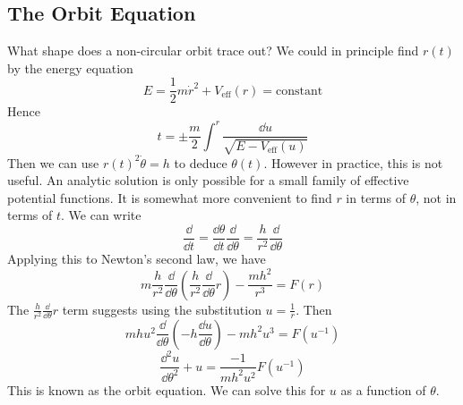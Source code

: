 \documentclass{article}
\begin{document}
\subsection{The Orbit Equation}
What shape does a non-circular orbit trace out? We could in principle find $r(t)$ by the energy equation
\[ E = \frac{1}{2}m \dot r^2 + V_\text{eff}(r) = \text{constant} \]
Hence
\[ t = \pm \frac{m}{2} \int^r \frac{\dd u}{\sqrt{E - V_\text{eff}(u)}} \]
Then we can use $r(t)^2\dot \theta = h$ to deduce $\theta(t)$. However in practice, this is not useful. An analytic solution is only possible for a small family of effective potential functions. It is somewhat more convenient to find $r$ in terms of $\theta$, not in terms of $t$. We can write
\[ \frac{\dd}{\dd t} = \frac{\dd \theta}{\dd t} \frac{\dd}{\dd \theta} = \frac{h}{r^2} \frac{\dd}{\dd \theta} \]
Applying this to Newton's second law, we have
\[ m\frac{h}{r^2} \frac{\dd}{\dd \theta}\left( \frac{h}{r^2} \frac{\dd}{\dd \theta} r \right) - \frac{mh^2}{r^3} = F(r) \]
The $\frac{h}{r^2} \frac{\dd}{\dd \theta} r$ term suggests using the substitution $u = \frac{1}{r}$. Then
\[ mhu^2 \frac{\dd}{\dd \theta}\left( -h\frac{\dd u}{\dd \theta} \right) - mh^2u^3 = F(u^{-1}) \]
\[ \frac{\dd^2 u}{\dd \theta^2} + u = \frac{-1}{mh^2u^2}F(u^{-1}) \]
This is known as the orbit equation. We can solve this for $u$ as a function of $\theta$.
\end{document}
